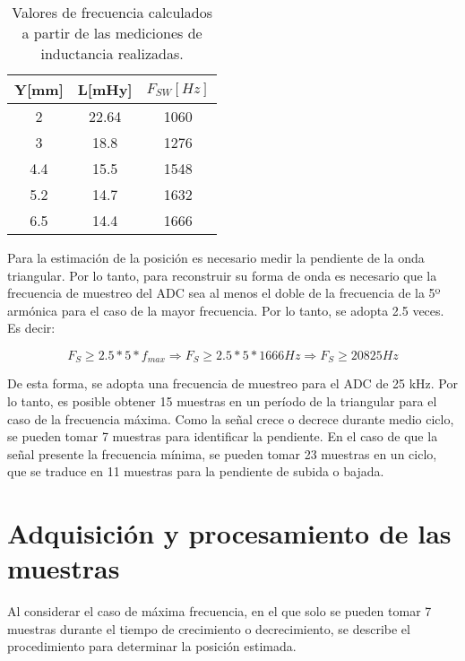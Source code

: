 \begin{table}[H]
	\begin{center}
		\begin{tabular}{| c | c | c |}
			\hline
			Y[mm] & L[mHy] & $F_{SW}[Hz]$\\ \hline
			2 & 22.64 & 1060\\ \hline
			3 & 18.8 & 1276\\ \hline
			4.4 & 15.5 & 1548\\ \hline
			5.2 & 14.7 & 1632\\ \hline		
			6.5 & 14.4 & 1666\\ \hline
		\end{tabular}
		\caption{Valores de frecuencia calculados a partir de las mediciones de inductancia realizadas.}
		\label{frecuencias-calculadas}
	\end{center}
\end{table}


\noindent Para la estimación de la posición es necesario medir la pendiente de la onda triangular. Por lo tanto, para reconstruir su forma de onda es necesario que la frecuencia de muestreo del ADC sea al menos el doble de la frecuencia de la 5º armónica para el caso de la mayor frecuencia. Por lo tanto, se adopta 2.5 veces. Es decir:

\begin{equation} 
	F_S \geq 2.5 * 5 * f_{max} \Rightarrow  F_S \geq 2.5 * 5 * 1666 Hz \Rightarrow F_S \geq 20825 Hz
\end{equation}

\noindent De esta forma, se adopta una frecuencia de muestreo para el ADC de  25 kHz. Por lo tanto, es posible obtener 15 muestras en un período de la triangular para el caso de la frecuencia máxima. Como la señal crece o decrece durante medio ciclo, se pueden tomar 7 muestras para identificar la pendiente. En el caso de que la señal presente la frecuencia mínima, se pueden tomar 23 muestras en un ciclo, que se traduce en 11 muestras para la pendiente de subida o bajada. 


\section{Adquisición y procesamiento de las muestras}

\noindent Al considerar el caso de máxima frecuencia, en el que solo se pueden tomar 7 muestras durante el tiempo de crecimiento o decrecimiento, se describe el procedimiento para determinar la posición estimada.


